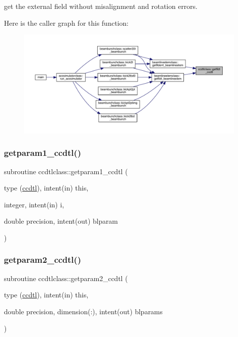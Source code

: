 get the external field without misalignment and rotation errors. 

Here is the caller graph for this function\+:\nopagebreak
\begin{figure}[H]
\begin{center}
\leavevmode
\includegraphics[width=350pt]{namespaceccdtlclass_aa1b97607af3b788522be9e22c479ce2a_icgraph}
\end{center}
\end{figure}
\mbox{\label{namespaceccdtlclass_a027b988ab66d8b89dabf46f5e45d82f5}} 
\subsubsection{\texorpdfstring{getparam1\_ccdtl()}{getparam1\_ccdtl()}}
{\footnotesize\ttfamily subroutine ccdtlclass\+::getparam1\+\_\+ccdtl (\begin{DoxyParamCaption}\item[{type (\mbox{\hyperlink{namespaceccdtlclass_structccdtlclass_1_1ccdtl}{ccdtl}}), intent(in)}]{this,  }\item[{integer, intent(in)}]{i,  }\item[{double precision, intent(out)}]{blparam }\end{DoxyParamCaption})}

\mbox{\label{namespaceccdtlclass_a8455f87d9ac20671adf737902c8b90d8}} 
\subsubsection{\texorpdfstring{getparam2\_ccdtl()}{getparam2\_ccdtl()}}
{\footnotesize\ttfamily subroutine ccdtlclass\+::getparam2\+\_\+ccdtl (\begin{DoxyParamCaption}\item[{type (\mbox{\hyperlink{namespaceccdtlclass_structccdtlclass_1_1ccdtl}{ccdtl}}), intent(in)}]{this,  }\item[{double precision, dimension(\+:), intent(out)}]{blparams }\end{DoxyParamCaption})}

